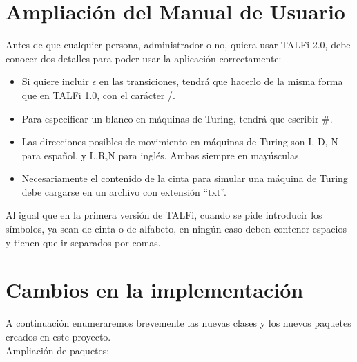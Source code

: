 \documentclass[12pt,a4paper,spanish]{book}
\begin{document}
\newpage
\section{Ampliaci\'on del Manual de Usuario}
Antes de que cualquier persona, administrador o no, quiera usar TALFi 2.0, debe conocer dos detalles para poder usar la aplicaci\'on correctamente:\\
\begin{itemize}
\item Si quiere incluir $\epsilon$ en las transiciones, tendr\'a que hacerlo de la misma forma que en TALFi 1.0, con el car\'acter /.
\item Para especificar un blanco en m\'aquinas de Turing, tendr\'a que escribir $\#$.
\item Las direcciones posibles de movimiento en m\'aquinas de Turing son I, D, N para espa\~nol, y L,R,N para ingl\'es. Ambas siempre en may\'usculas. 
\item Necesariamente el contenido de la cinta para simular una m\'aquina de Turing debe cargarse en un archivo con extensi\'on ``txt''.
\end{itemize}
Al igual que en la primera versi\'on de TALFi, cuando se pide introducir los s\'imbolos, ya sean de cinta o de alfabeto, en ning\'un caso deben contener espacios y tienen que ir separados por comas.

\newpage
\section{Cambios en la implementaci\'on}
A continuaci\'on enumeraremos brevemente las nuevas clases y los nuevos paquetes creados en este proyecto.\\
Ampliaci\'on de paquetes:
\end{document}
